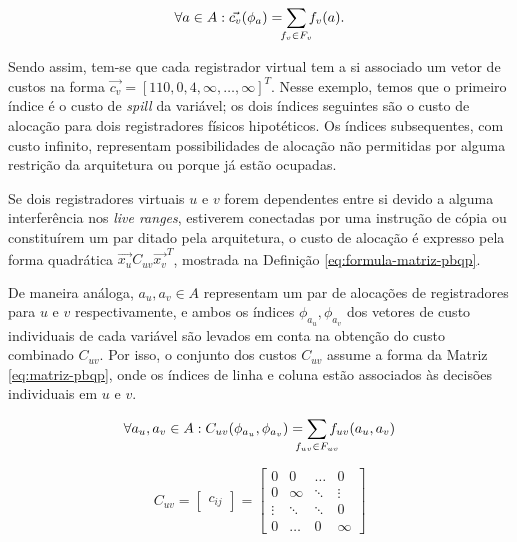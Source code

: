 \documentclass[
	12pt,				%
	openright,			%
	twoside,			%
	a4paper,			%
	tcc,			%
	]{ABNT-DC-UEL}
\begin{document}
\begin{equation}
    \forall a \in A : \Vec{c_v}({\phi}_a)=\sum_{\mathclap{f_v \in F_v}}f_v(a).
    \label{eq:vetor-pbqp}
\end{equation}

Sendo assim, tem-se que cada registrador virtual tem a si associado um vetor de custos na forma $\Vec{c_v} = [110, 0, 4, \infty, \ldots, \infty]^T$. Nesse exemplo, temos que o primeiro índice é o custo de \textit{spill} da variável; os dois índices seguintes são o custo de alocação para dois registradores físicos hipotéticos. Os índices subsequentes, com custo infinito, representam possibilidades de alocação não permitidas por alguma restrição da arquitetura ou porque já estão ocupadas.

Se dois registradores virtuais $u$ e $v$ forem dependentes entre si devido a alguma interferência nos \textit{live ranges}, estiverem conectadas por uma instrução de cópia ou constituírem um par ditado pela arquitetura, o custo de alocação é expresso pela forma quadrática $\Vec{x_u}C_{uv}\Vec{x_v}^T$, mostrada na Definição \ref{eq:formula-matriz-pbqp}. 

De maneira análoga, $a_u, a_v \in A$ representam um par de alocações de registradores para $u$ e $v$ respectivamente, e ambos os índices $\phi_{a_u},\phi_{a_v}$ dos vetores de custo individuais de cada variável são levados em conta na obtenção do custo combinado $C_{uv}$. Por isso, o conjunto dos custos $C_{uv}$ assume a forma da Matriz \ref{eq:matriz-pbqp}, onde os índices de linha e coluna estão associados às decisões individuais em $u$ e $v$.

\begin{equation}
        \forall a_u, a_v \in A : C_{uv}(\phi_{a_u},\phi_{a_v}) = \sum_{\mathclap{f_{uv} \in F_{uv}}} f_{uv}(a_u,a_v)
        \label{eq:formula-matriz-pbqp}
    \end{equation}

\begin{equation}
        C_{uv} = \begin{bmatrix}
        c_{ij}
        \end{bmatrix} = \begin{bmatrix}
            0 & 0 & \ldots & 0 \\
            0 & \infty & \ddots & \vdots \\
            \vdots & \ddots & \ddots & 0 \\
            0 & \ldots & 0 & \infty
        \end{bmatrix}
        \label{eq:matriz-pbqp}
\end{equation}
\end{document}
